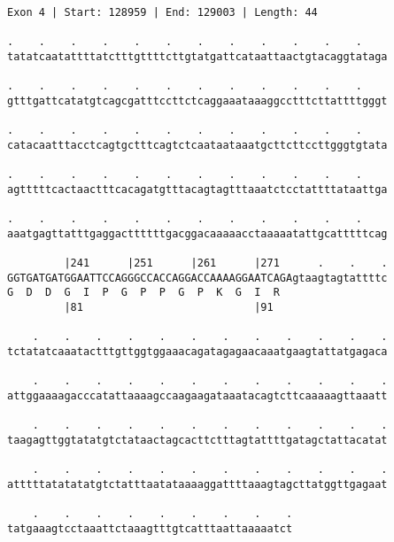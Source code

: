 \documentclass{article}
\begin{document}
\begin{Verbatim}[fontfamily=courier]
Exon 4 | Start: 128959 | End: 129003 | Length: 44

.    .    .    .    .    .    .    .    .    .    .    .    
tatatcaatattttatctttgttttcttgtatgattcataattaactgtacaggtataga

.    .    .    .    .    .    .    .    .    .    .    .    
gtttgattcatatgtcagcgatttccttctcaggaaataaaggcctttcttattttgggt

.    .    .    .    .    .    .    .    .    .    .    .    
catacaatttacctcagtgctttcagtctcaataataaatgcttcttccttgggtgtata

.    .    .    .    .    .    .    .    .    .    .    .    
agtttttcactaactttcacagatgtttacagtagtttaaatctcctattttataattga

.    .    .    .    .    .    .    .    .    .    .    .    
aaatgagttatttgaggacttttttgacggacaaaaacctaaaaatattgcatttttcag

         |241      |251      |261      |271      .    .    .
GGTGATGATGGAATTCCAGGGCCACCAGGACCAAAAGGAATCAGAgtaagtagtattttc
G  D  D  G  I  P  G  P  P  G  P  K  G  I  R                 
         |81                           |91                  

    .    .    .    .    .    .    .    .    .    .    .    .
tctatatcaaatactttgttggtggaaacagatagagaacaaatgaagtattatgagaca

    .    .    .    .    .    .    .    .    .    .    .    .
attggaaaagacccatattaaaagccaagaagataaatacagtcttcaaaaagttaaatt

    .    .    .    .    .    .    .    .    .    .    .    .
taagagttggtatatgtctataactagcacttctttagtattttgatagctattacatat

    .    .    .    .    .    .    .    .    .    .    .    .
atttttatatatatgtctatttaatataaaaggattttaaagtagcttatggttgagaat

    .    .    .    .    .    .    .    .    .
tatgaaagtcctaaattctaaagtttgtcatttaattaaaaatct
\end{Verbatim}
\newpage
\end{document}
